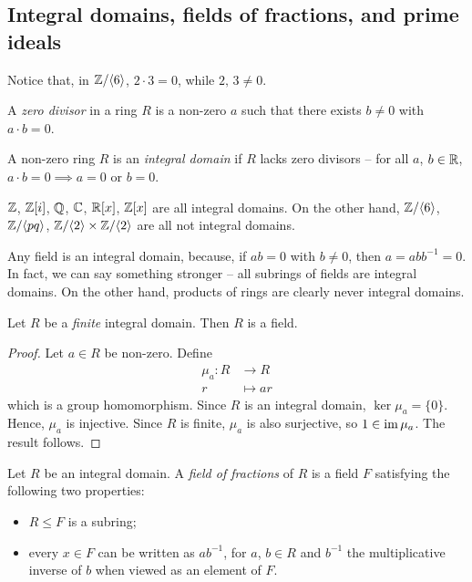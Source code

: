 \documentclass{../template/note}
\begin{document}
    \subsection{Integral domains, fields of fractions, and prime ideals}

    Notice that, in $\mathbb Z/\!\left \langle 6 \right \rangle$, $2\cdot 3 = 0$, while $2,\, 3 \neq 0$.
    
    \begin{definition}
        A \emph{zero divisor} in a ring $R$ is a non-zero $a$ such that there exists $b \neq 0$ with $a \cdot b = 0$.
    \end{definition}
    
    \begin{definition}
        A non-zero ring $R$ is an \emph{integral domain} if $R$ lacks zero divisors -- for all $a$, $b \in \mathbb R$, $a \cdot b = 0 \implies a = 0$ or $b=0$.
    \end{definition}
    
    \begin{example*}
        $\mathbb Z$, $\mathbb Z[i]$, $\mathbb Q$, $\mathbb C$, $\mathbb R[x]$, $\mathbb Z[x]$ are all integral domains. On the other hand, $\mathbb Z/\!\left \langle 6 \right \rangle$, $\mathbb Z/\!\left \langle pq \right \rangle$, $\mathbb Z/\!\left \langle 2 \right \rangle \times \mathbb Z/\!\left \langle 2 \right \rangle$ are all not integral domains.
    \end{example*}

    Any field is an integral domain, because, if $ab=0$ with $b\neq 0$, then $a = abb^{-1} = 0$. In fact, we can say something stronger -- all subrings of fields are integral domains. On the other hand, products of rings are clearly never integral domains.

    \begin{lemma}
        Let $R$ be a \emph{finite} integral domain. Then $R$ is a field.
    \end{lemma}
    
    \begin{proof}
        Let $a \in R$ be non-zero. Define
        \begin{align*}
            \mu_a: R &\to R \\
            r &\mapsto ar
        \end{align*}
        which is a group homomorphism. Since $R$ is an integral domain, $\ker \mu_a = \{0\}$. Hence, $\mu_a$ is injective. Since $R$ is finite, $\mu_a$ is also surjective, so $1 \in \operatorname{im} \mu_a$. The result follows.
    \end{proof}
    
    \begin{definition}
        Let $R$ be an integral domain. A \emph{field of fractions} of $R$ is a field $F$ satisfying the following two properties:
        \begin{itemize}
            \item $R \leq F$ is a subring;
            \item every $x \in F$ can be written as $ab^{-1}$, for $a$, $b \in R$ and $b^{-1}$ the multiplicative inverse of $b$ when viewed as an element of $F$.
        \end{itemize}
    \end{definition}
    
\end{document}
